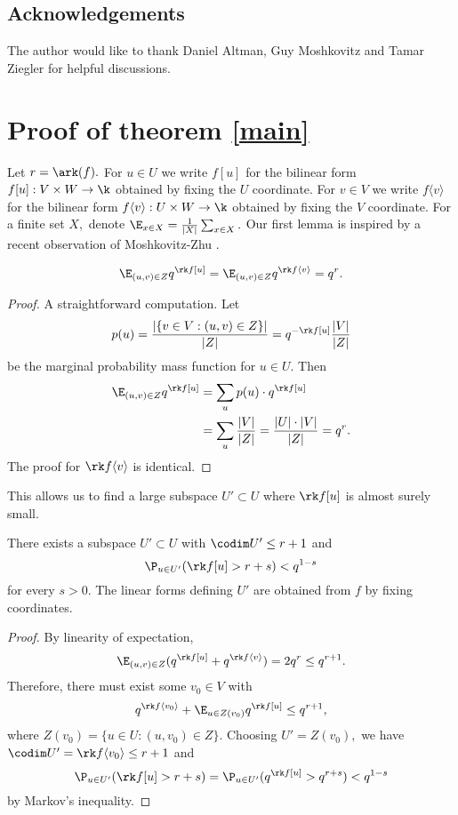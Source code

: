 \subsection{Acknowledgements} The author would like to thank Daniel Altman, Guy Moshkovitz and Tamar Ziegler for helpful discussions.

\section{Proof of theorem \ref{main}}

Let $r=\ark(f).$ For $u\in U$ we write $f[u]$ for the bilinear form $f[u]:V\times W\to \k $ obtained by fixing the $U$ coordinate. For $v\in V$ we write $f\langle v\rangle$ for the bilinear form $f\langle v\rangle: U\times W\to \k$ obtained by fixing the $V$ coordinate. For a finite set $X,$ denote $\E_{x\in X} = \frac{1}{|X|} \sum_{x\in X}.$ Our first lemma is inspired by a recent observation of Moshkovitz-Zhu \cite{MZ}.
\begin{lemma}
    \[
    \E_{(u,v)\in Z} q^{\rk f[u]} = \E_{(u,v)\in Z} q^{\rk f\langle v\rangle} = q^r.
    \]
\end{lemma}

\begin{proof}
    A straightforward computation. Let
    $$p(u) = \frac{|\{v\in V:(u,v)\in Z\}|}{|Z|} = q^{-\rk f[u]} \frac{|V|}{|Z|}$$
    be the marginal probability mass function for $u\in U.$ Then 
    \begin{align*}
        \E_{(u,v)\in Z} q^{\rk f[u]} &=  \sum_u p(u)\cdot  q^{\rk f[u]} \\
        &= \sum_u \frac{|V|}{|Z|} = \frac{|U|\cdot|V|}{|Z|} = q^r.  
    \end{align*}
    The proof for $\rk f\langle v\rangle$ is identical.
\end{proof}

This allows us to find a large subspace $U'\subset U$ where $\rk f[u]$ is almost surely small.

\begin{lemma}\label{subspace}
    There exists a subspace $U'\subset U$ with $\codim U' \le r+1$ and 
    \[
    \P_{u\in U'} (\rk f[u] > r+s) < q^{1-s}
    \]
    for every $s>0.$ The linear forms defining $U'$ are obtained from $f$ by fixing coordinates.
\end{lemma}

\begin{proof}
     By linearity of expectation,
    \[
    \E_{(u,v)\in Z} (q^{\rk f[u]}+q^{\rk f\langle v\rangle}) = 2q^r \le q^{r+1}.
    \]
    Therefore, there must exist some $v_0\in V$ with
    \[
    q^{\rk f\langle v_0\rangle}+\E_{u\in Z(v_0)}  q^{\rk f[u]} \le q^{r+1},
    \]
    where $Z(v_0) = \{u\in U: (u,v_0)\in Z\}.$ Choosing $U' = Z(v_0),$ we have \linebreak $\codim U' = \rk f\langle v_0\rangle \le r+1$ and 
    \[
    \P_{u\in U'} (\rk f[u] > r+s) = \P_{u\in U'} (q^{\rk f[u]} > q^{r+s}) < q^{1-s} 
    \]
    by Markov's inequality.
\end{proof}


